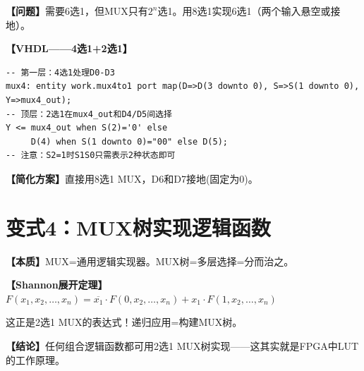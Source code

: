 \begin{detailbox}[完整教学]
\textbf{【问题】}需要6选1，但MUX只有$2^n$选1。用8选1实现6选1（两个输入悬空或接地）。

\textbf{【VHDL——4选1+2选1】}
\begin{lstlisting}
-- 第一层：4选1处理D0-D3
mux4: entity work.mux4to1 port map(D=>D(3 downto 0), S=>S(1 downto 0), Y=>mux4_out);
-- 顶层：2选1在mux4_out和D4/D5间选择
Y <= mux4_out when S(2)='0' else
     D(4) when S(1 downto 0)="00" else D(5);
-- 注意：S2=1时S1S0只需表示2种状态即可
\end{lstlisting}

\textbf{【简化方案】}直接用8选1 MUX，D6和D7接地(固定为0)。
\end{detailbox}


\section{变式4：MUX树实现逻辑函数}

\begin{detailbox}[完整教学]
\textbf{【本质】}MUX=通用逻辑实现器。MUX树=多层选择=分而治之。

\textbf{【Shannon展开定理】}$F(x_1,x_2,\dots,x_n)= \overline{x_1}\cdot F(0,x_2,\dots,x_n) + x_1\cdot F(1,x_2,\dots,x_n)$

这正是2选1 MUX的表达式！递归应用=构建MUX树。

\textbf{【结论】}任何组合逻辑函数都可用2选1 MUX树实现——这其实就是FPGA中LUT的工作原理。
\end{detailbox}
